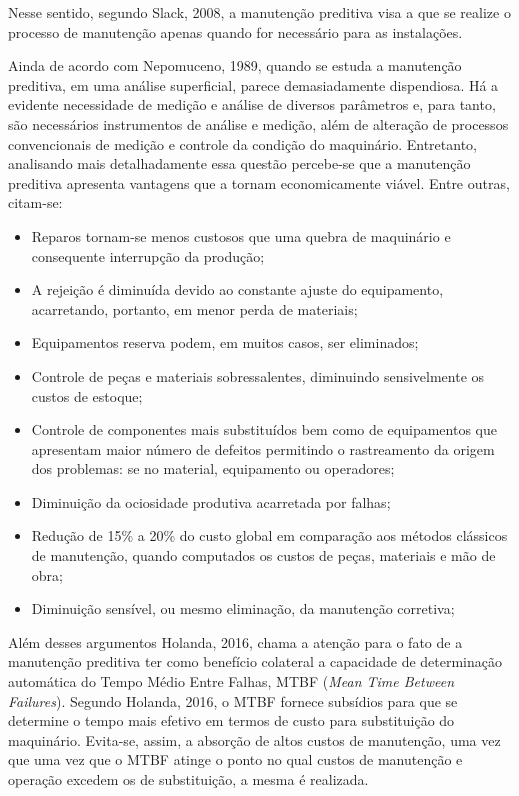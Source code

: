\documentclass[
	12pt,				
	oneside,			
	a4paper,			
	english,			
	brazil,			
	]{abntex2ppgsi}
\begin{document}
Nesse sentido, segundo Slack, 2008, a manutenção preditiva visa a que se realize o processo de manutenção apenas quando for necessário para as instalações. 

Ainda de acordo com Nepomuceno, 1989, quando se estuda a manutenção preditiva, em uma análise superficial, parece demasiadamente dispendiosa. Há a evidente necessidade de medição e análise de diversos parâmetros e, para tanto, são necessários instrumentos de análise e medição, além de alteração de processos convencionais de medição e controle da condição do maquinário. Entretanto, analisando mais detalhadamente essa questão percebe-se que a manutenção preditiva apresenta vantagens que a tornam economicamente viável. Entre outras, citam-se: 

\begin{itemize}
	\item Reparos tornam-se menos custosos que uma quebra de maquinário e consequente interrupção da produção;
	\item A rejeição é diminuída devido ao constante ajuste do equipamento, acarretando, portanto, em menor perda de materiais;
	\item Equipamentos reserva podem, em muitos casos, ser eliminados;
	\item Controle de peças e materiais sobressalentes, diminuindo sensivelmente os custos de estoque;
	\item Controle de componentes mais substituídos bem como de equipamentos que apresentam maior número de defeitos permitindo o rastreamento da origem dos problemas: se no material, equipamento ou operadores;
	\item Diminuição da ociosidade produtiva acarretada por falhas;
	\item Redução de 15\% a 20\% do custo global em comparação aos métodos clássicos de manutenção, quando computados os custos de peças, materiais e mão de obra;
	\item Diminuição sensível, ou mesmo eliminação, da manutenção corretiva;
\end{itemize}

Além desses argumentos Holanda, 2016, chama a atenção para o fato de a manutenção preditiva ter como benefício colateral a capacidade de determinação automática do Tempo Médio Entre Falhas, MTBF (\textit{Mean Time Between Failures}). Segundo Holanda, 2016, o MTBF fornece subsídios para que se determine o tempo mais efetivo em termos de custo para substituição do maquinário. Evita-se, assim, a absorção de altos custos de manutenção, uma vez que uma vez que o MTBF atinge o ponto no qual custos de manutenção e operação excedem os de substituição, a mesma é realizada. 
\end{document}
